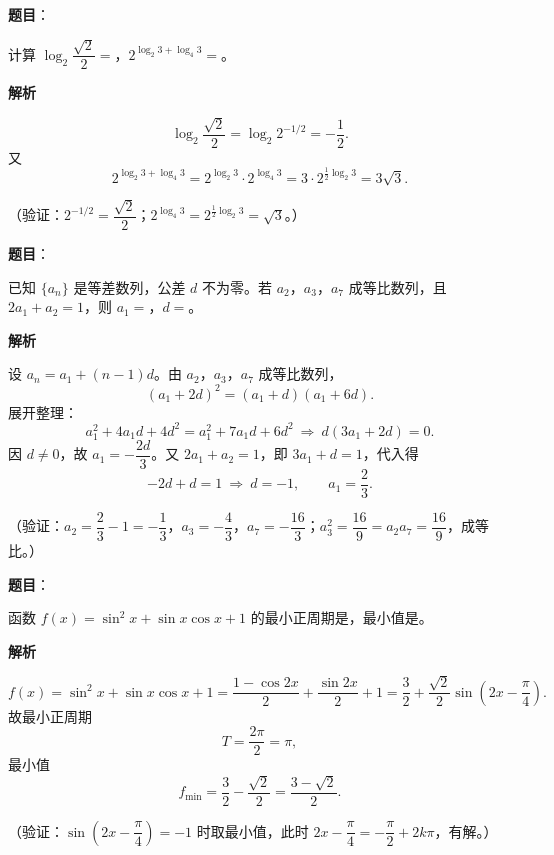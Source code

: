 \begin{answer}

\textbf{题目}：

计算 \(\log_2\dfrac{\sqrt{2}}{2}=\)\gkblank{}，\(2^{\log_2 3+\log_4 3}=\)\gkblank{}。

\textbf{解析}

\nopagebreak[4]
\[
\log_2\frac{\sqrt2}{2}=\log_2 2^{-1/2}=-\frac12.
\]
又
\nopagebreak[4]
\[
2^{\log_2 3+\log_4 3}=2^{\log_2 3}\cdot2^{\log_4 3}
=3\cdot2^{\frac12\log_2 3}
=3\sqrt3.
\]

（验证：\(2^{-1/2}=\dfrac{\sqrt2}{2}\)；\(2^{\log_4 3}=2^{\frac12\log_2 3}=\sqrt3\)。）


\end{answer}
\begin{answer}

\textbf{题目}：

已知 \(\{a_n\}\) 是等差数列，公差 \(d\) 不为零。若 \(a_2\)，\(a_3\)，\(a_7\) 成等比数列，且 \(2a_1+a_2=1\)，则 \(a_1=\)\gkblank{}，\(d=\)\gkblank{}。

\textbf{解析}

设 \(a_n=a_1+(n-1)d\)。由 \(a_2\)，\(a_3\)，\(a_7\) 成等比数列，
\nopagebreak[4]
\[
(a_1+2d)^2=(a_1+d)(a_1+6d).
\]
展开整理：
\nopagebreak[4]
\[
a_1^2+4a_1d+4d^2=a_1^2+7a_1d+6d^2
\ \Longrightarrow\ d(3a_1+2d)=0.
\]
因 \(d\neq0\)，故 \(a_1=-\dfrac{2d}{3}\)。又 \(2a_1+a_2=1\)，即 \(3a_1+d=1\)，代入得
\nopagebreak[4]
\[
-2d+d=1\ \Longrightarrow\ d=-1,\qquad a_1=\frac23.
\]

（验证：\(a_2=\dfrac23-1=-\dfrac13\)，\(a_3=-\dfrac43\)，\(a_7=-\dfrac{16}{3}\)；\(a_3^2=\dfrac{16}{9}=a_2a_7=\dfrac{16}{9}\)，成等比。）


\end{answer}
\begin{answer}

\textbf{题目}：

函数 \(f(x)=\sin^2x+\sin x\cos x+1\) 的最小正周期是\gkblank{}，最小值是\gkblank{}。

\textbf{解析}

\nopagebreak[4]
\[
f(x)=\sin^2x+\sin x\cos x+1
=\frac{1-\cos2x}{2}+\frac{\sin2x}{2}+1
=\frac32+\frac{\sqrt2}{2}\sin\left(2x-\frac{\pi}{4}\right).
\]
故最小正周期
\nopagebreak[4]
\[
T=\frac{2\pi}{2}=\pi,
\]
最小值
\nopagebreak[4]
\[
f_{\min}=\frac32-\frac{\sqrt2}{2}=\frac{3-\sqrt2}{2}.
\]

（验证：\(\sin\left(2x-\dfrac{\pi}{4}\right)=-1\) 时取最小值，此时 \(2x-\dfrac{\pi}{4}=-\dfrac{\pi}{2}+2k\pi\)，有解。）


\end{answer}
